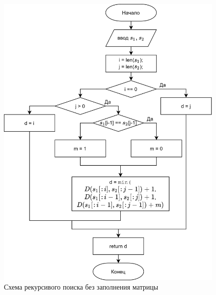     \begin{figure}[h!]
        \centering
        \includegraphics[scale=0.18]{img/LevRec}
        \caption{Схема рекурсивого поиска без заполнения матрицы}
        \label{schema:rec:Levenstein}
    \end{figure}

